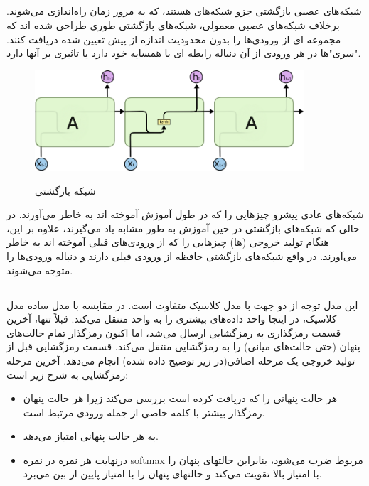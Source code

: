\subsection{}
شبکه‌های عصبی بازگشتی
جزو شبکه‌های
هستند، که به مرور زمان راه‌اندازی می‌شوند.
برخلاف شبکه‌های عصبی معمولی، شبکه‌های بازگشتی طوری طراحی شده اند که مجموعه ای از ورودی‌ها را بدون محدودیت اندازه از پیش تعیین شده دریافت کنند. "سری"ها در هر ورودی از آن دنباله رابطه ای با همسایه خود دارد یا تاثیری بر آنها دارد.
\begin{figure}[H]
\centering
\caption{  شبکه بازگشتی }\label{RNN}
\includegraphics[width=10cm]{figs/RNN.png}
\label{fig:test}
\end{figure}
شبکه‌های عادی پیشرو چیزهایی را که در طول آموزش آموخته اند به خاطر می‌آورند. در حالی که شبکه‌های بازگشتی در حین آموزش به طور مشابه یاد می‌گیرند، علاوه بر این، هنگام تولید خروجی (ها) چیزهایی را که از ورودی‌های قبلی آموخته اند به خاطر می‌آورند. در واقع شبکه‌های بازگشتی حافظه از ورودی قبلی دارند و دنباله ورودی‌ها را متوجه می‌شوند.
\subsection{}
این مدل
توجه
از دو جهت با مدل کلاسیک متفاوت است.	
در مقایسه با مدل ساده مدل کلاسیک، در اینجا واحد
داده‌های بیشتری را به واحد
منتقل می‌کند. قبلاً تنها، آخرین
قسمت رمزگذاری به رمزگشایی ارسال می‌شد، اما اکنون رمزگذار تمام حالت‌های پنهان (حتی حالت‌های میانی) را به رمزگشایی منتقل می‌کند.
قسمت رمزگشایی قبل از تولید خروجی یک مرحله اضافی(در زیر توضیح داده شده) انجام می‌دهد.
آخرین مرحله رمزگشایی به شرح زیر است:
\begin{itemize}
\item هر حالت پنهانی را که دریافت کرده است بررسی می‌کند زیرا هر حالت پنهان رمزگذار بیشتر با کلمه خاصی از جمله ورودی مرتبط است.
\item به هر حالت پنهانی امتیاز می‌دهد.
\item درنهایت هر نمره در نمره softmax مربوط ضرب می‌شود، بنابراین حالتهای پنهان را با امتیاز بالا تقویت می‌کند و حالتهای پنهان را با امتیاز پایین از بین می‌برد.
\end{itemize}

